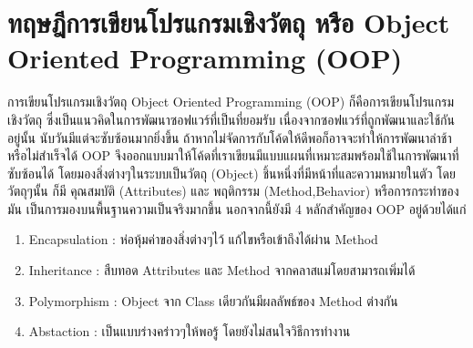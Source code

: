 \section{ทฤษฎีการเขียนโปรแกรมเชิงวัตถุ หรือ Object Oriented Programming (OOP)}

การเขียนโปรแกรมเชิงวัตถุ Object Oriented Programming (OOP) ก็คือการเขียนโปรแกรมเชิงวัตถุ ซึ่งเป็นแนวคิดในการพัฒนาซอฟแวร์ที่เป็นที่ยอมรับ เนื่องจากซอฟแวร์ที่ถูกพัฒนาและใช้กันอยู่นั้น นับวันมีแต่จะซับซ้อนมากยิ่งขึ้น ถ้าหากไม่จัดการกับโค้ดให้ดีพอก็อาจจะทำให้การพัฒนาล่าช้าหรือไม่สำเร็จได้  OOP จึงออกแบบมาให้โค้ดที่เราเขียนมีแบบแผนที่เหมาะสมพร้อมใช้ในการพัฒนาที่ซับซ้อนได้ โดยมองสิ่งต่างๆในระบบเป็นวัตถุ (Object) ชิ้นหนึ่งที่มีหน้าที่และความหมายในตัว โดยวัตถุๆนั้น ก็มี คุณสมบัติ (Attributes) และ พฤติกรรม (Method,Behavior) หรือการกระทำของมัน เป็นการมองบนพื้นฐานความเป็นจริงมากขึ้น นอกจากนี้ยังมี 4 หลักสําคัญของ OOP อยู่ด้วยได้แก่

\begin{enumerate}

\item Encapsulation : ห่อหุ้มค่าของสิ่งต่างๆไว้ แก้ไขหรือเข้าถึงได้ผ่าน Method
\item Inheritance : สืบทอด Attributes และ Method จากคลาสแม่โดยสามารถเพิ่มได้
\item Polymorphism : Object จาก Class เดียวกันมีผลลัพธ์ของ Method ต่างกัน
\item Abstaction : เป็นแบบร่างคร่าวๆให้พอรู้ โดยยังไม่สนใจวิธีการทำงาน


\end{enumerate}